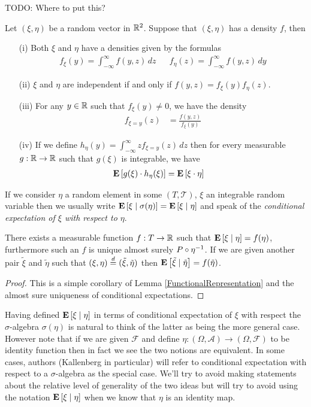 TODO: Where to put this?
\begin{lem}Let $(\xi, \eta)$ be a random vector in $\mathbb{R}^2$.
  Suppose that $(\xi, \eta)$ has a density $f$, then 
\begin{itemize}
\item[(i)]Both  $\xi$ and $\eta$ have a densities given by the
  formulas
\begin{align*}
f_{\xi}(y) = \int_{-\infty}^\infty f(y,z) \, dz & & f_{\eta}(z) = \int_{-\infty}^\infty f(y,z) \, dy
\end{align*}
\item[(ii)]$\xi$ and $\eta$ are independent if and only if $f(y,z) = f_{\xi}(y) f_{\eta}(z) $.
\item[(iii)]For any $y \in \mathbb{R}$ such that $f_{\xi}(y) \neq 0$, we
  have the density
\begin{align*}
f_{\xi=y}(z) &= \frac{f(y,z)}{f_{\xi}(y)}
\end{align*}
\item[(iv)]If we define $h_{\eta}(y) = \int_{-\infty}^\infty z f_{\xi=y}(z)
  \, dz$ then for every measurable $g : \mathbb{R} \to \mathbb{R}$ such that
$g(\xi)$ is integrable, we have
\begin{align*}
\textbf{E}\left[g(\xi) \cdot h_{\eta}(\xi)\right] &= \textbf{E}\left[\xi \cdot \eta\right]
\end{align*}
\end{itemize}
\end{lem}

If we consider $\eta$ a random element in some $(T, \mathcal{T})$, $\xi$ an integrable random
variable then we usually write $\textbf{E}\left[ \xi \mid \sigma(\eta) \right] =
\textbf{E}\left[ \xi \mid \eta \right]$ and speak of the \emph{conditional
  expectation of $\xi$ with respect to $\eta$}.  
\begin{lem}There exists a measurable function $f : T \to \mathbb{R}$ such
  that $\textbf{E}\left[ \xi \mid \eta \right] = f(\eta)$, furthermore such an
  $f$ is unique almost surely $P \circ \eta^{-1}$.  If we are
  given another pair $\tilde{\xi}$ and $\tilde{\eta}$ such that $(\xi,
  \eta) \overset{d}= (\tilde{\xi}, \tilde{\eta})$ then $\textbf{E}\left[ \tilde{\xi} \mid \tilde{\eta} \right] = f(\tilde{\eta})$.
\end{lem}
\begin{proof}This is a simple corollary of Lemma
  \ref{FunctionalRepresentation} and the almost sure uniqueness of
  conditional expectations.
\end{proof}

Having defined $\textbf{E}\left[ \xi \mid \eta \right]$ in terms of conditional
expectation of $\xi$ with respect the $\sigma$-algebra $\sigma(\eta)$
is natural to think of the latter as being the more general case.
However note that if we are given $\mathcal{F}$ and define $\eta :
(\Omega, \mathcal{A}) \to (\Omega, \mathcal{F})$ to be identity
function then in fact we see the two notions are equivalent.  In some
cases, authors (Kallenberg in particular) will refer to conditional
expectation with respect to a $\sigma$-algebra as the special case.
We'll try to avoid making statements about the relative level of
generality of the two ideas but will try to avoid using the notation
$\textbf{E}\left[ \xi \mid \eta \right]$ when we know that $\eta$ is an
identity map.

